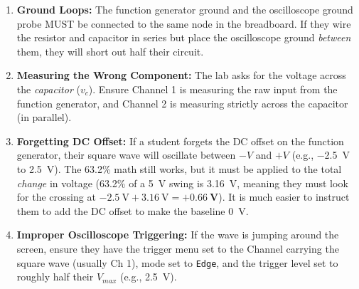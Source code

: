\documentclass[11pt]{article}
\begin{document}
\begin{enumerate}
  \item \textbf{Ground Loops:} The function generator ground and the oscilloscope ground probe MUST be connected to the same node in the breadboard. If they wire the resistor and capacitor in series but place the oscilloscope ground \textit{between} them, they will short out half their circuit.
  \item \textbf{Measuring the Wrong Component:} The lab asks for the voltage across the \textit{capacitor} ($v_c$). Ensure Channel 1 is measuring the raw input from the function generator, and Channel 2 is measuring strictly across the capacitor (in parallel).
  \item \textbf{Forgetting DC Offset:} If a student forgets the DC offset on the function generator, their square wave will oscillate between $-V$ and $+V$ (e.g., \SI{-2.5}{\volt} to \SI{+2.5}{\volt}). The 63.2\% math still works, but it must be applied to the total \textit{change} in voltage (63.2\% of a \SI{5}{\volt} swing is \SI{3.16}{\volt}, meaning they must look for the crossing at $\SI{-2.5}{\volt} + \SI{3.16}{\volt} = \mathbf{+\SI{0.66}{\volt}}$). It is much easier to instruct them to add the DC offset to make the baseline \SI{0}{\volt}.
  \item \textbf{Improper Oscilloscope Triggering:} If the wave is jumping around the screen, ensure they have the trigger menu set to the Channel carrying the square wave (usually Ch 1), mode set to \texttt{Edge}, and the trigger level set to roughly half their $V_{max}$ (e.g., \SI{2.5}{\volt}).
\end{enumerate}
\end{document}
